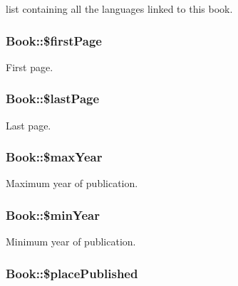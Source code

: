 \label{classBook_a2c4309c16fe7bbc190a11815044334fa}
list containing all the languages linked to this book. \hypertarget{classBook_a387848127a960472ad77a28e965eb688}{
\subsubsection[{\$firstPage}]{\setlength{\rightskip}{0pt plus 5cm}Book::\$firstPage}}
\label{classBook_a387848127a960472ad77a28e965eb688}
First page. \hypertarget{classBook_a459f6ea8d3000089d048fad6c4bba961}{
\subsubsection[{\$lastPage}]{\setlength{\rightskip}{0pt plus 5cm}Book::\$lastPage}}
\label{classBook_a459f6ea8d3000089d048fad6c4bba961}
Last page. \hypertarget{classBook_a9e0fb12f3337abe8773af3065a179340}{
\subsubsection[{\$maxYear}]{\setlength{\rightskip}{0pt plus 5cm}Book::\$maxYear}}
\label{classBook_a9e0fb12f3337abe8773af3065a179340}
Maximum year of publication. \hypertarget{classBook_a7fd3b935f402594ad114dc3a91031e5d}{
\subsubsection[{\$minYear}]{\setlength{\rightskip}{0pt plus 5cm}Book::\$minYear}}
\label{classBook_a7fd3b935f402594ad114dc3a91031e5d}
Minimum year of publication. \hypertarget{classBook_a1e821cbef3523d8a43e4a8ba93dd3e3c}{
\subsubsection[{\$placePublished}]{\setlength{\rightskip}{0pt plus 5cm}Book::\$placePublished}}
